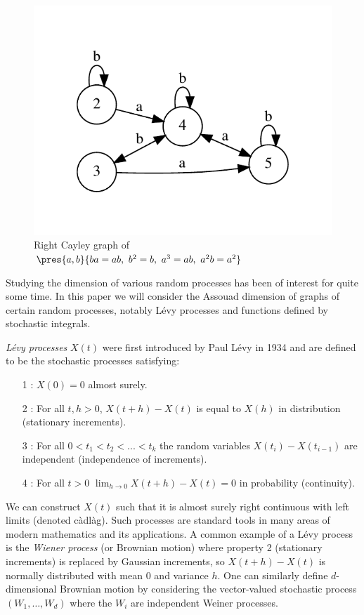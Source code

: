 \begin{figure}[H]
  \centering
  \vspace{-4.0em}
  \includegraphics{pics/ch-pairs/tc-cayley-graph}
  \vspace{-4.0em}
  \caption[Todd--Coxeter example: right Cayley graph]
  {Right Cayley graph of $\pres{a, b}{ba=ab,\ b^2=b,\ a^3=ab,\ a^2b=a^2}$}
  \label{fig:tc-cayley-graph}
\end{figure}






Studying the dimension of various random processes has been of interest for quite some time. In this paper we will consider the Assouad dimension of graphs of certain random processes, notably L\'evy processes and functions defined by stochastic integrals. 

\emph{L\'{e}vy processes} $X(t)$ were first introduced by Paul L\'evy in 1934 \cite{Le} and are defined to be the stochastic processes satisfying:
\begin{itemize}
	\item[1]: $X(0)=0$ almost surely.
	\item[2]: For all $t,h>0$, $X(t+h)-X(t)$ is equal to $X(h)$ in distribution (stationary increments).
	\item[3]: For all $0<t_1<t_2<...<t_k$ the random variables $X(t_i)-X(t_{i-1})$ are independent (independence of increments).
	\item[4]: For all $t>0$ $\lim_{h\to 0} X(t+h)-X(t)=0$ in probability (continuity).
\end{itemize}
We can construct $X(t)$ such that it is almost surely right continuous with left limits (denoted c\`adl\`ag). Such processes are standard tools in many areas of modern mathematics and its applications. A common example of a L\'evy process is the \emph{Wiener process} (or Brownian motion) where property 2 (stationary increments) is replaced by Gaussian increments, so $X(t+h)-X(t)$ is normally distributed with mean 0 and variance $h$. One can similarly define $d$-dimensional Brownian motion by considering the vector-valued stochastic process $(W_1,\ldots, W_d)$ where the $W_i$ are independent Weiner processes. 

